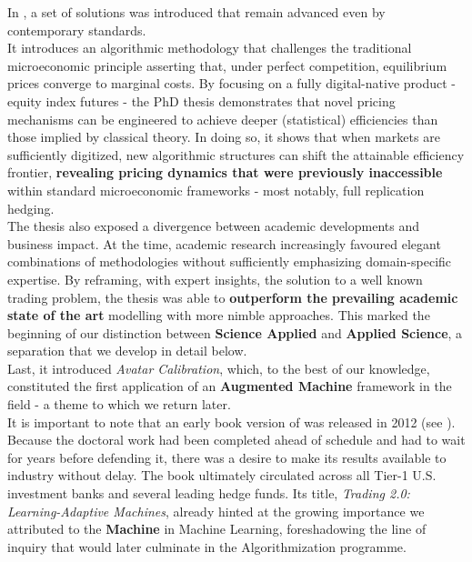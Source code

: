 \documentclass{article}
\begin{document}
In \cite{PhD}, a set of solutions was introduced that remain advanced even by contemporary standards.\\

It introduces an algorithmic methodology that challenges the traditional microeconomic principle asserting that, under perfect competition, equilibrium prices converge to marginal costs. By focusing on a fully digital-native product - equity index futures - the PhD thesis demonstrates that novel pricing mechanisms can be engineered to achieve deeper (statistical) efficiencies than those implied by classical theory. In doing so, it shows that when markets are sufficiently digitized, new algorithmic structures can shift the attainable efficiency frontier, \textbf{revealing pricing dynamics that were previously inaccessible} within standard microeconomic frameworks - most notably, full replication hedging.\\

The thesis also exposed a divergence between academic developments and business impact. At the time, academic research increasingly favoured elegant combinations of methodologies without sufficiently emphasizing domain-specific expertise. By reframing, with expert insights, the solution to a well known trading problem, the thesis was able to \textbf{outperform the prevailing academic state of the art} modelling with more nimble approaches. This marked the beginning of our distinction between \textbf{Science Applied} and \textbf{Applied Science}, a separation that we develop in detail below.\\

Last, it introduced \textit{Avatar Calibration}, which, to the best of our knowledge, constituted the first application of an \textbf{Augmented Machine} framework in the field - a theme to which we return later.\\

It is important to note that an early book version of \cite{PhD} was released in 2012 (see \cite{book}). Because the doctoral work had been completed ahead of schedule and had to wait for years before defending it, there was a desire to make its results available to industry without delay. The book ultimately circulated across all Tier-1 U.S. investment banks and several leading hedge funds. Its title, \textit{Trading 2.0: Learning-Adaptive Machines}, already hinted at the growing importance we attributed to the \textbf{Machine} in Machine Learning, foreshadowing the line of inquiry that would later culminate in the Algorithmization programme.\\
\end{document}
